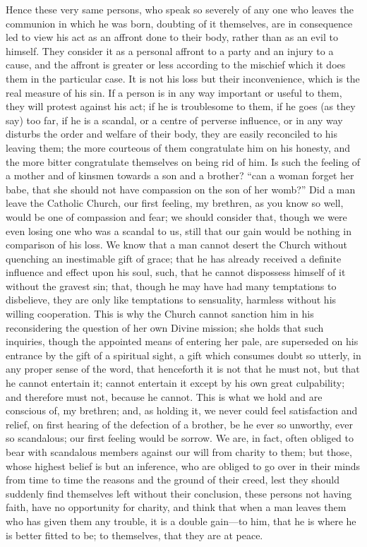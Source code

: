 Hence these very same persons, who speak so severely of any one who
leaves the communion in which he was born, doubting of it themselves,
are in consequence led to view his act as an affront done to their
body, rather than as an evil to himself. They consider it as a
personal affront to a party and an injury to a cause, and the affront
is greater or less according to the mischief which it does them in the
particular case. It is not his loss but their inconvenience, which is
the real measure of his sin. If a person is in any way important or
useful to them, they will protest against his act; if he is
troublesome to them, if he goes (as they say) too far, if he is a
scandal, or a centre of perverse influence, or in any way disturbs the
order and welfare of their body, they are easily reconciled to his
leaving them; the more courteous of them congratulate him on his
honesty, and the more bitter congratulate themselves on being rid of
him. Is such the feeling of a mother and of kinsmen towards a son and
a brother? ``can a woman forget her babe, that she should not have
compassion on the son of her womb?'' Did a man leave the Catholic
Church, our first feeling, my brethren, as you know so well, would be
one of compassion and fear; we should consider that, though we were
even losing one who was a scandal to us, still that our gain would be
nothing in comparison of his loss. We know that a man cannot desert
the Church without quenching an inestimable gift of grace; that he has
already received a definite influence and effect upon his soul, such,
that he cannot dispossess himself of it without the gravest sin; that,
though he may have had many temptations to disbelieve, they are only
like temptations to sensuality, harmless without his willing
cooperation. This is why the Church cannot sanction him in his
reconsidering the question of her own Divine mission; she holds that
such inquiries, though the appointed means of entering her pale, are
superseded on his entrance by the gift of a spiritual sight, a gift
which consumes doubt so utterly, in any proper sense of the word, that
henceforth it is not that he must not, but that he cannot entertain
it; cannot entertain it except by his own great culpability; and
therefore must not, because he cannot. This is what we hold and are
conscious of, my brethren; and, as holding it, we never could feel
satisfaction and relief, on first hearing of the defection of a
brother, be he ever so unworthy, ever so scandalous; our first feeling
would be sorrow. We are, in fact, often obliged to bear with
scandalous members against our will from charity to them; but those,
whose highest belief is but an inference, who are obliged to go over
in their minds from time to time the reasons and the ground of their
creed, lest they should suddenly find themselves left without their
conclusion, these persons not having faith, have no opportunity for
charity, and think that when a man leaves them who has given them any
trouble, it is a double gain—to him, that he is where he is better
fitted to be; to themselves, that they are at peace.

